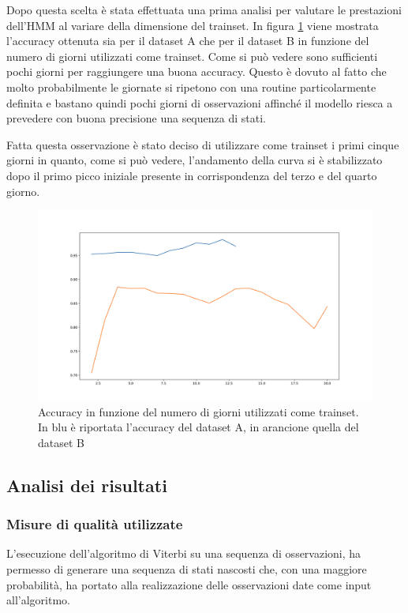 \documentclass[10pt,a4paper]{article}
\begin{document}
	Dopo questa scelta è stata effettuata una prima analisi per valutare le prestazioni dell'HMM al variare della dimensione del trainset. In figura \ref{fig:traintestrate} viene mostrata l'accuracy ottenuta sia per il dataset A che per il dataset B in funzione del numero di giorni utilizzati come trainset.
	Come si può vedere sono sufficienti pochi giorni per raggiungere una buona accuracy. Questo è dovuto al fatto che molto probabilmente le giornate si ripetono con una routine particolarmente definita e bastano quindi pochi giorni di osservazioni affinché il modello riesca a prevedere con buona precisione una sequenza di stati.

	Fatta questa osservazione è stato deciso di utilizzare come trainset i primi cinque giorni in quanto, come si può vedere, l'andamento della curva si è stabilizzato dopo il primo picco iniziale presente in corrispondenza del terzo e del quarto giorno.

	\begin{figure}[!htb]
	\includegraphics[width=\linewidth]{immagini/traintestrate.png}
	\caption{Accuracy in funzione del numero di giorni utilizzati come trainset. In blu è riportata l'accuracy del dataset A, in arancione quella del dataset B}
	\label{fig:traintestrate}
	\end{figure}

	\subsection{Analisi dei risultati}

	\subsubsection{Misure di qualità utilizzate}

	L'esecuzione dell'algoritmo di Viterbi su una sequenza di osservazioni, ha permesso di generare una sequenza di stati nascosti che, con una maggiore probabilità, ha portato alla realizzazione delle osservazioni date come input all'algoritmo.
\end{document}
